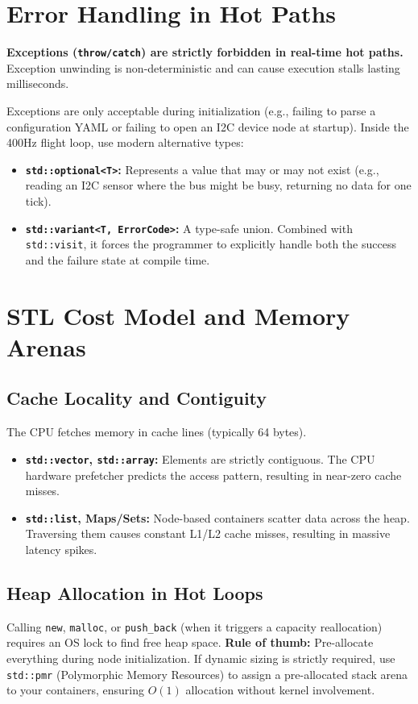 \documentclass{article}
\begin{document}
\section{Error Handling in Hot Paths}
\textbf{Exceptions (\texttt{throw/catch}) are strictly forbidden in real-time hot paths.} Exception unwinding is non-deterministic and can cause execution stalls lasting milliseconds.

Exceptions are only acceptable during initialization (e.g., failing to parse a configuration YAML or failing to open an I2C device node at startup). Inside the 400Hz flight loop, use modern alternative types:
\begin{itemize}
    \item \textbf{\texttt{std::optional<T>}:} Represents a value that may or may not exist (e.g., reading an I2C sensor where the bus might be busy, returning no data for one tick).
    \item \textbf{\texttt{std::variant<T, ErrorCode>}:} A type-safe union. Combined with \texttt{std::visit}, it forces the programmer to explicitly handle both the success and the failure state at compile time.
\end{itemize}

\section{STL Cost Model and Memory Arenas}
\subsection{Cache Locality and Contiguity}
The CPU fetches memory in cache lines (typically 64 bytes). 
\begin{itemize}
    \item \textbf{\texttt{std::vector}, \texttt{std::array}:} Elements are strictly contiguous. The CPU hardware prefetcher predicts the access pattern, resulting in near-zero cache misses.
    \item \textbf{\texttt{std::list}, \textbf{Maps/Sets}:} Node-based containers scatter data across the heap. Traversing them causes constant L1/L2 cache misses, resulting in massive latency spikes.
\end{itemize}

\subsection{Heap Allocation in Hot Loops}
Calling \texttt{new}, \texttt{malloc}, or \texttt{push\_back} (when it triggers a capacity reallocation) requires an OS lock to find free heap space. \textbf{Rule of thumb:} Pre-allocate everything during node initialization. If dynamic sizing is strictly required, use \texttt{std::pmr} (Polymorphic Memory Resources) to assign a pre-allocated stack arena to your containers, ensuring $O(1)$ allocation without kernel involvement.
\end{document}
